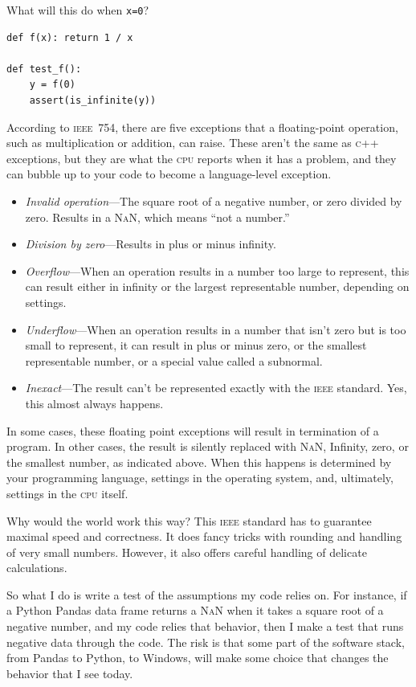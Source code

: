 \documentclass[fleqn,10pt]{olplainarticle}
\newcommand{\cpp}{\textsc{c}++\xspace}
\newcommand{\cpu}{\textsc{cpu}\xspace}
\newcommand{\nan}{\textsc{NaN}\xspace}
\newcommand{\ieee}{\textsc{ieee}\xspace}
\begin{document}
What will this do when \texttt{x=0}?
\begin{lstlisting}
def f(x): return 1 / x

def test_f():
    y = f(0)
    assert(is_infinite(y))
\end{lstlisting}

According to \ieee~754, there are five exceptions that a floating-point
operation, such as multiplication or addition, can raise. These aren't the
same as \cpp exceptions, but they are what the \cpu reports when
it has a problem, and they can bubble up to your code to become a
language-level exception.
\begin{itemize}
    \item \emph{Invalid operation}---The square root of a negative
    number, or zero divided by zero. Results in a \nan, which means
    ``not a number.''
    \item \emph{Division by zero}---Results in plus or minus infinity.
    \item \emph{Overflow}---When an operation results in a number
    too large to represent, this can result either in infinity
    or the largest representable number, depending on settings.
    \item \emph{Underflow}---When an operation results in a number
    that isn't zero but is too small to represent, it can result
    in plus or minus zero, or the smallest representable number,
    or a special value called a subnormal.
    \item \emph{Inexact}---The result can't be represented exactly
    with the \ieee standard. Yes, this almost always happens.
\end{itemize}
In some cases, these floating point exceptions will result in termination
of a program. In other cases, the result is silently replaced
with \nan, Infinity, zero, or the smallest number, as indicated above.
When this happens is determined by your programming language,
settings in the operating system, and, ultimately, settings
in the \cpu itself.

Why would the world work this way? This \ieee standard has to guarantee
maximal speed and correctness. It does fancy tricks with rounding
and handling of very small numbers. However, it also offers
careful handling of delicate calculations.

So what I do is write a test of the assumptions my code relies on.
For instance, if a Python Pandas data frame returns a \nan when it
takes a square root of a negative number, and my code relies that behavior,
then I make a test that runs negative data through the code. The risk
is that some part of the software stack, from Pandas to Python, to
Windows, will make some choice that changes the behavior that I see today.
\end{document}
